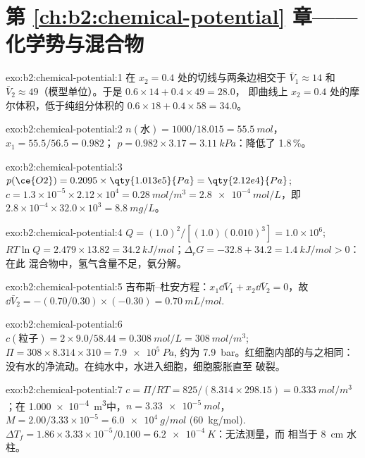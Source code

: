 \section*{第 \ref{ch:b2:chemical-potential} 章——化学势与混合物}

\begin{solution}{exo:b2:chemical-potential:1}
在 $x_2 = 0.4$ 处的切线与两条边相交于 $\bar V_1 \approx 14$ 和 $\bar
V_2 \approx 49$（模型单位）。于是 $0.6 \times 14 + 0.4 \times 49 = 28.0$，
即曲线上 $x_2 = 0.4$ 处的摩尔体积，低于纯组分体积的
$0.6 \times 18 + 0.4 \times 58 = 34.0$。
\end{solution}

\begin{solution}{exo:b2:chemical-potential:2}
$n(\text{水}) = 1000/18.015 = \qty{55.5}{mol}$，$x_1 = 55.5/56.5 = 0.982$；
$p = 0.982 \times 3.17 = \qty{3.11}{kPa}$：降低了 1.8\,\%。
\end{solution}

\begin{solution}{exo:b2:chemical-potential:3}
$p(\ce{O2}) = 0.2095 \times \qty{1.013e5}{Pa} = \qty{2.12e4}{Pa}$;
$c = 1.3 \times 10^{-5} \times 2.12 \times 10^4 = \qty{0.28}{mol/m^3} =
\qty{2.8e-4}{mol/L}$，即 $2.8 \times 10^{-4} \times 32.0 \times 10^3 =
\qty{8.8}{mg/L}$。
\end{solution}

\begin{solution}{exo:b2:chemical-potential:4}
$Q = (1.0)^2/[(1.0)(0.010)^3] = 1.0 \times 10^6$; $RT\ln Q = 2.479 \times 13.82 =
\qty{34.2}{kJ/mol}$；$\Delta_r G = -32.8 + 34.2 = \qty{+1.4}{kJ/mol} > 0$：在此
混合物中，氢气含量不足，氨分解。
\end{solution}

\begin{solution}{exo:b2:chemical-potential:5}
吉布斯–杜安方程：$x_1\dd\bar V_1 + x_2\dd\bar V_2 = 0$，故 $\dd\bar V_2 =
-(0.70/0.30) \times (-0.30) = \qty{+0.70}{mL/mol}$.
\end{solution}

\begin{solution}{exo:b2:chemical-potential:6}
$c(\text{粒子}) = 2 \times 9.0/58.44 = \qty{0.308}{mol/L} =
\qty{308}{mol/m^3}$; $\Pi = 308 \times 8.314 \times 310 = \qty{7.9e5}{Pa}$,
约为 \qty{7.9}{bar}。红细胞内部的与之相同：
没有水的净流动。在纯水中，水进入细胞，细胞膨胀直至
破裂。
\end{solution}

\begin{solution}{exo:b2:chemical-potential:7}
$c = \Pi/RT = 825/(8.314 \times 298.15) = \qty{0.333}{mol/m^3}$；在
\qty{1.000e-4}{m^3}中，$n = \qty{3.33e-5}{mol}$，$M = 2.00/3.33 \times 10^{-5}
= \qty{6.0e4}{g/mol}$ (\qty{60}{kg/mol}). $\Delta T_f = 1.86 \times 3.33
\times 10^{-5}/0.100 = \qty{6.2e-4}{K}$：无法测量，而
相当于 \qty{8}{cm} 水柱。
\end{solution}

